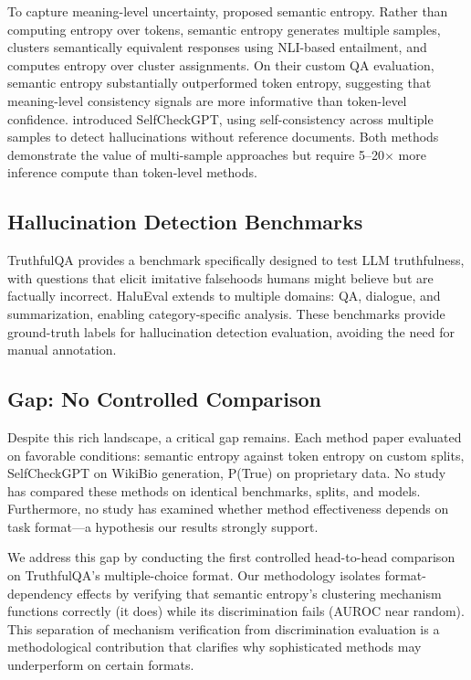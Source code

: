 To capture meaning-level uncertainty, \citet{kuhn2023semantic} proposed semantic entropy. Rather than computing entropy over tokens, semantic entropy generates multiple samples, clusters semantically equivalent responses using NLI-based entailment, and computes entropy over cluster assignments. On their custom QA evaluation, semantic entropy substantially outperformed token entropy, suggesting that meaning-level consistency signals are more informative than token-level confidence. \citet{manakul2023selfcheckgpt} introduced SelfCheckGPT, using self-consistency across multiple samples to detect hallucinations without reference documents. Both methods demonstrate the value of multi-sample approaches but require 5--20$\times$ more inference compute than token-level methods.

\subsection{Hallucination Detection Benchmarks}

TruthfulQA \citep{lin2022truthfulqa} provides a benchmark specifically designed to test LLM truthfulness, with questions that elicit imitative falsehoods humans might believe but are factually incorrect. HaluEval \citep{li2023halueval} extends to multiple domains: QA, dialogue, and summarization, enabling category-specific analysis. These benchmarks provide ground-truth labels for hallucination detection evaluation, avoiding the need for manual annotation.

\subsection{Gap: No Controlled Comparison}

Despite this rich landscape, a critical gap remains. Each method paper evaluated on favorable conditions: semantic entropy against token entropy on custom splits, SelfCheckGPT on WikiBio generation, P(True) on proprietary data. No study has compared these methods on identical benchmarks, splits, and models. Furthermore, no study has examined whether method effectiveness depends on task format---a hypothesis our results strongly support.

We address this gap by conducting the first controlled head-to-head comparison on TruthfulQA's multiple-choice format. Our methodology isolates format-dependency effects by verifying that semantic entropy's clustering mechanism functions correctly (it does) while its discrimination fails (AUROC near random). This separation of mechanism verification from discrimination evaluation is a methodological contribution that clarifies why sophisticated methods may underperform on certain formats.
